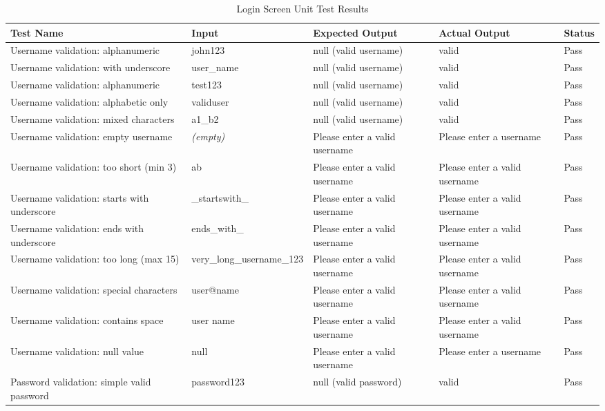 \begin{table*}[t]
\centering
\caption{Login Screen Unit Test Results}
\label{tab:login_screen_unit}
\begin{tabular}{|p{5cm}|p{2.5cm}|p{3cm}|p{3cm}|p{1cm}|}
\hline
\textbf{Test Name} & \textbf{Input} & \textbf{Expected Output} & \textbf{Actual Output} & \textbf{Status} \\ \hline
Username validation: alphanumeric & john123 & null (valid username) & valid & Pass \\ \hline
Username validation: with underscore & user\_name & null (valid username) & valid & Pass \\ \hline
Username validation: alphanumeric & test123 & null (valid username) & valid & Pass \\ \hline
Username validation: alphabetic only & validuser & null (valid username) & valid & Pass \\ \hline
Username validation: mixed characters & a1\_b2 & null (valid username) & valid & Pass \\ \hline
Username validation: empty username & \textit{(empty)} & Please enter a valid username & Please enter a username & Pass \\ \hline
Username validation: too short (min 3) & ab & Please enter a valid username & Please enter a valid username & Pass \\ \hline
Username validation: starts with underscore & \_startswith\_ & Please enter a valid username & Please enter a valid username & Pass \\ \hline
Username validation: ends with underscore & ends\_with\_ & Please enter a valid username & Please enter a valid username & Pass \\ \hline
Username validation: too long (max 15) & very\_long\_username\_123 & Please enter a valid username & Please enter a valid username & Pass \\ \hline
Username validation: special characters & user@name & Please enter a valid username & Please enter a valid username & Pass \\ \hline
Username validation: contains space & user name & Please enter a valid username & Please enter a valid username & Pass \\ \hline
Username validation: null value & null & Please enter a valid username & Please enter a username & Pass \\ \hline
Password validation: simple valid password & password123 & null (valid password) & valid & Pass \\ \hline

\end{tabular}
\end{table*}

